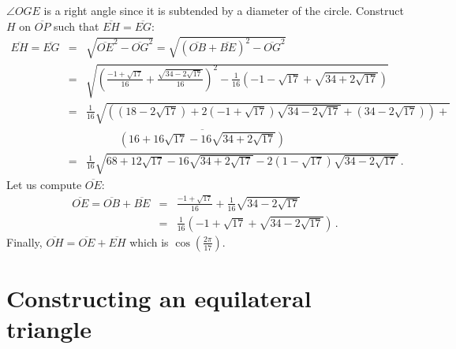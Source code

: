 \documentclass[11pt,a4paper]{article}
\newenvironment{form}[1]{%
\begin{displaymath}%
\renewcommand{\arraystretch}{#1}%
\begin{array}{lcl}}%
{\end{array}%
\end{displaymath}%
}
\newcommand*{\disfrac}[2]{\displaystyle\frac{#1}{#2}}
\begin{document}
$\angle OGE$ is a right angle since it is subtended by a diameter of the circle. Construct $H$ on $\overline{OP}$ such that $\overline{EH}=\overline{EG}$:
\begin{form}{2}
\overline{EH}=\overline{EG}&=&\sqrt{\overline{OE}^2-\overline{OG}^2}=\sqrt{(\overline{OB}+\overline{BE})^2-\overline{OG}^2}\\
&=&\sqrt{\left(\disfrac{-1+\sqrt{17}}{16}+\disfrac{\sqrt{34-2\sqrt{17}}}{16}\right)^2-
\disfrac{1}{16}\left(-1-\sqrt{17}+\sqrt{34+2\sqrt{17}}\right)}
\\
&=&\disfrac{1}{16}\sqrt{\left(
(18-2\sqrt{17})+ 2(-1+\sqrt{17})\sqrt{34-2\sqrt{17}}+
(34-2\sqrt{17})\right)+}\\
&&\quad\quad\quad\overline{
\left(16+16\sqrt{17}-16\sqrt{34+2\sqrt{17}}\right)}\\
&=&\disfrac{1}{16}\sqrt{
68+12\sqrt{17}-16\sqrt{34+2\sqrt{17}}-2(1-\sqrt{17})\sqrt{34-2\sqrt{17}}
}\,.
\end{form}
Let us compute $\overline{OE}$:
\begin{form}{2}
\overline{OE}=\overline{OB}+\overline{BE}&=&\disfrac{-1+\sqrt{17}}{16}+\disfrac{1}{16}\sqrt{34-2\sqrt{17}}\\
&=&\disfrac{1}{16}\left(-1+\sqrt{17}+\sqrt{34-2\sqrt{17}}\right)\,.
\end{form}
Finally, $\overline{OH}=\overline{OE}+\overline{EH}$ which is $\cos \left(\disfrac{2\pi}{17}\right)$.


\appendix
\section{Constructing an equilateral triangle}\label{a.triangle}
\end{document}
